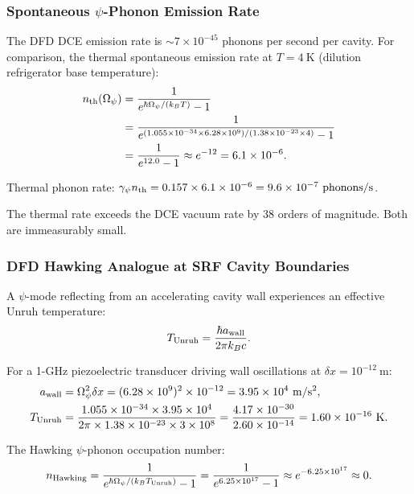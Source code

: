 \documentclass[aps,prd,twocolumn,superscriptaddress]{revtex4-2}
\newcommand{\Opsi}{\Omega_\psi}
\begin{document}
\subsubsection{Spontaneous $\psi$-Phonon Emission Rate}

The DFD DCE emission rate is $\sim 7\times 10^{-45}$ phonons per second
per cavity.  For comparison, the thermal spontaneous emission rate at
$T = 4~\mathrm{K}$ (dilution refrigerator base temperature):
\begin{align}
n_{\rm th}(\Opsi) &= \frac{1}{e^{\hbar\Opsi/(k_B T)} - 1} \notag\\
&= \frac{1}{e^{(1.055\times 10^{-34}\times 6.28\times 10^9)/(1.38\times 10^{-23}\times 4)}-1} \notag\\
&= \frac{1}{e^{12.0}-1} \approx e^{-12} = 6.1\times 10^{-6}.
\end{align}

Thermal phonon rate: $\gamma_\psi n_{\rm th} = 0.157\times 6.1\times 10^{-6}
= 9.6\times 10^{-7}~\mathrm{phonons/s}$.

The thermal rate exceeds the DCE vacuum rate by 38 orders of magnitude.
Both are immeasurably small.

\subsubsection{DFD Hawking Analogue at SRF Cavity Boundaries}

A $\psi$-mode reflecting from an accelerating cavity wall experiences
an effective Unruh temperature:
\begin{equation}
T_{\rm Unruh} = \frac{\hbar a_{\rm wall}}{2\pi k_B c}.
\end{equation}

For a 1-GHz piezoelectric transducer driving wall oscillations at
$\delta x = 10^{-12}~\mathrm{m}$:
\begin{align}
a_{\rm wall} &= \Opsi^2\delta x
= (6.28\times 10^9)^2\times 10^{-12}
= 3.95\times 10^4~\mathrm{m/s^2}, \\
T_{\rm Unruh} &= \frac{1.055\times 10^{-34}\times 3.95\times 10^4}{2\pi\times 1.38\times 10^{-23}\times 3\times 10^8}
= \frac{4.17\times 10^{-30}}{2.60\times 10^{-14}}
= 1.60\times 10^{-16}~\mathrm{K}.
\end{align}

The Hawking $\psi$-phonon occupation number:
\begin{equation}
n_{\rm Hawking} = \frac{1}{e^{\hbar\Opsi/(k_B T_{\rm Unruh})} - 1}
= \frac{1}{e^{6.25\times 10^{17}}-1} \approx e^{-6.25\times 10^{17}} \approx 0.
\end{equation}
\end{document}
